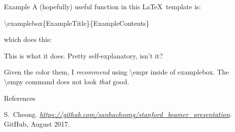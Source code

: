\documentclass[pdf]{beamer}
\newcommand{\empy}[1]{{\color{darkorange}\emph{#1}}}
\newcommand{\empr}[1]{{\color{cardinalred}\emph{#1}}}
\theoremstyle{remark}
\theoremstyle{definition}
\newcommand{\examplebox}[2]{
\begin{tcolorbox}[colframe=darkcardinal,colback=boxgray,title=#1]
#2
\end{tcolorbox}}
\begin{document}
\begin{frame}{Example}
A (hopefully) useful function in this \LaTeX~template is:
\begin{center}
	\textbackslash examplebox\{ExampleTitle\}\{ExampleContents\}
\end{center}
which does this:
\examplebox{Example of the Command \textbackslash examplebox}{
This is what it does. Pretty self-explanatory, isn't it?

Given the color them, I \empr{recommend} using \textbackslash empr inside of examplebox. The \textbackslash empy command does not look \empy{that} good.
}
\end{frame}



\begin{frame}{References}
\begin{thebibliography}{3}
	S.~Cheong. \empr{\href{https://github.com/sanhacheong/stanford_beamer_template}{https://github.com/sanhacheong/stanford\_beamer\_presentation}}. {GitHub}, August 2017.
\end{thebibliography}
\end{frame}
\end{document}
